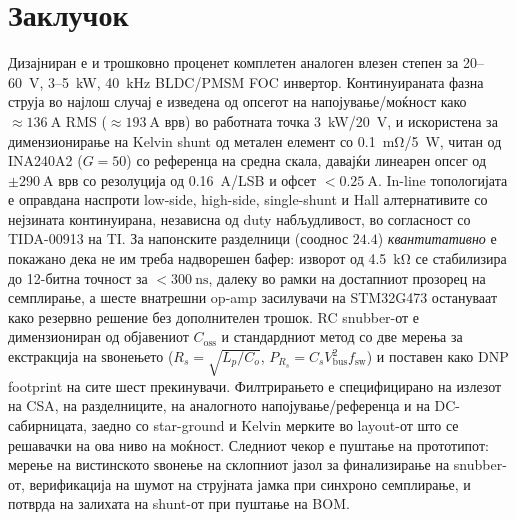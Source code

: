 \documentclass[journal,onecolumn,11pt]{IEEEtran}
\newcommand{\Vdcbus}{V_{\mathrm{bus}}}
\newcommand{\Fswsw}{f_{\mathrm{sw}}}
\begin{document}
\section{Заклучок}
Дизајниран е и трошковно проценет комплетен аналоген влезен степен за \mbox{20--\SI{60}{\volt}},
\mbox{3--\SI{5}{\kilo\watt}}, \SI{40}{\kilo\hertz} BLDC/PMSM FOC инвертор. Континуираната фазна струја
во најлош случај е изведена од опсегот на напојување/моќност како \(\approx\SI{136}{\ampere}\) RMS
(\(\approx\SI{193}{\ampere}\) врв) во работната точка \SI{3}{\kilo\watt}/\SI{20}{\volt}, и искористена
за димензионирање на Kelvin shunt од метален елемент со \SI{0.1}{\milli\ohm}/\SI{5}{\watt}, читан од
INA240A2 ($G{=}50$) со референца на средна скала, давајќи линеарен опсег од \(\pm\SI{290}{\ampere}\)
врв со резолуција од \SI{0.16}{\ampere/LSB} и офсет \(<\SI{0.25}{\ampere}\). In-line топологијата е
оправдана наспроти low-side, high-side, single-shunt и Hall алтернативите со нејзината континуирана,
независна од duty набљудливост, во согласност со TIDA-00913 на TI. За напонските разделници (сооднос
\(24.4\)) \emph{квантитативно} е покажано дека не им треба надворешен бафер: изворот од
\SI{4.5}{\kilo\ohm} се стабилизира до 12-битна точност за \(<\SI{300}{\nano\second}\), далеку во рамки
на достапниот прозорец на семплирање, а шесте внатрешни op-amp засилувачи на STM32G473 остануваат како
резервно решение без дополнителен трошок. RC snubber-от е димензиониран од објавениот
\(C_{\mathrm{oss}}\) и стандардниот метод со две мерења за екстракција на ѕвонењето
(\(R_s=\sqrt{L_p/C_o}\), \(P_{R_s}=C_s\Vdcbus^2\Fswsw\)) и поставен како DNP footprint на сите шест
прекинувачи. Филтрирањето е специфицирано на излезот на CSA, на разделниците, на аналогното
напојување/референца и на DC-сабирницата, заедно со star-ground и Kelvin мерките во layout-от што се
решавачки на ова ниво на моќност. Следниот чекор е пуштање на прототипот: мерење на вистинското ѕвонење
на склопниот јазол за финализирање на snubber-от, верификација на шумот на струјната јамка при синхроно
семплирање, и потврда на залихата на shunt-от при пуштање на BOM.
\end{document}
